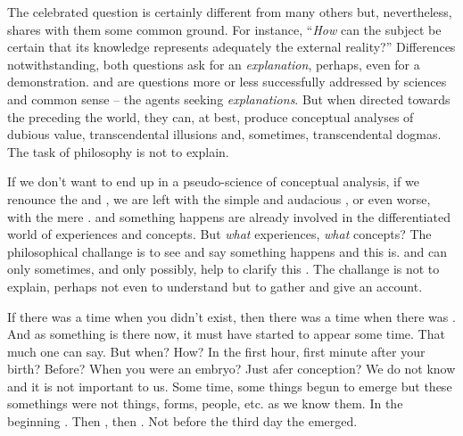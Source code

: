 The celebrated question is certainly different from many others but,
nevertheless, shares with them some common ground. For instance, ``{\em How} can
the subject be certain that its knowledge represents adequately the external
reality?''  Differences notwithstanding, both questions ask for an {\em
  explanation}, perhaps, even for a demonstration.   and  are
questions more or less successfully addressed by sciences and common sense --
the agents seeking {\em explanations}. But when directed towards the
 preceding the world, they can, at best, produce conceptual analyses
of dubious value, transcendental illusions and, sometimes, transcendental
dogmas. The task of philosophy is not to explain.

If we don't want to end up in a pseudo-science of conceptual analysis, if we
renounce the  and , we are left with the simple and
audacious , or even worse, with the mere .   and
 something happens are already involved in the differentiated world of
experiences and concepts.  But {\em what} experiences, {\em what} concepts?  The
philosophical challange is to see and say  something happens and
 this is.  and  can only sometimes, and only
possibly, help to clarify this .  The challange is not to explain,
perhaps not even to understand but to gather and give an account.

\pa\label{pureexp} If there was a time when you didn't exist, then there was a
time when there was .   And as something is there now, it
must have started to appear some time.  That much one can say.  But when? How?
In the first hour, first minute after your birth? Before? When you were an
embryo? Just afer conception? We do not know and it is not important to us.
  Some
time, some things begun to emerge but these somethings were not things, forms,
people, etc. as we know them. In the beginning .  Then ,
then .  Not
before the third day the  emerged.

